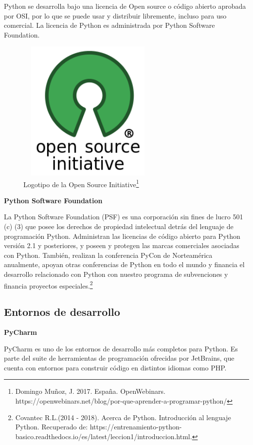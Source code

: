 \documentclass[12pt]{report}%
\begin{document}
Python se desarrolla bajo una licencia de Open source o código abierto aprobada por OSI, por lo que se puede usar y distribuir libremente, incluso para uso comercial.
La licencia de Python es administrada por Python Software Foundation.
\begin{figure}[H]
\centering
	 \includegraphics[width=7cm, height=7cm]{Open_Source.png}
	 \caption[Logotipo de la Open Source Initiative]{Logotipo de la Open Source Initiative\footnote{Domingo Muñoz, J. 2017. España. OpenWebinars. https://openwebinars.net/blog/por-que-aprender-a-programar-python/}}%
	 	 \label{fig:Open Source Initiative}
\end{figure}

   \textbf{Python Software Foundation}
   
La Python Software Foundation (PSF) es una corporación sin fines de lucro 501 (c) (3) que posee los derechos de propiedad intelectual detrás del lenguaje de programación Python. Administran las licencias de código abierto para Python versión 2.1 y posteriores, y poseen y protegen las marcas comerciales asociadas con Python.
También, realizan la conferencia PyCon de Norteamérica anualmente, apoyan otras conferencias de Python en todo el mundo y financia el desarrollo relacionado con Python con nuestro programa de subvenciones y financia proyectos especiales.\footnote{Covantec R.L.(2014 - 2018). Acerca de Python. Introducción al lenguaje Python. Recuperado de: https://entrenamiento-python-basico.readthedocs.io/es/latest/leccion1/introduccion.html.}\\

\subsection{Entornos de desarrollo}
\textbf {PyCharm}

PyCharm es uno de los entornos de desarrollo más completos para Python. Es parte del suite de herramientas de programación ofrecidas por JetBrains, que cuenta con entornos para construir código en distintos idiomas como PHP.
\end{document}
